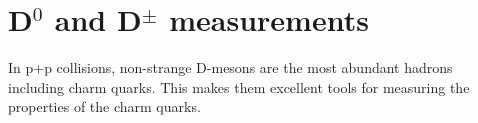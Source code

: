% 
% 
% 


\section{D$^0$ and D$^\pm$ measurements}
In p+p collisions, non-strange D-mesons are the most abundant hadrons including charm quarks. This makes them excellent tools for measuring the properties of the charm quarks. 
